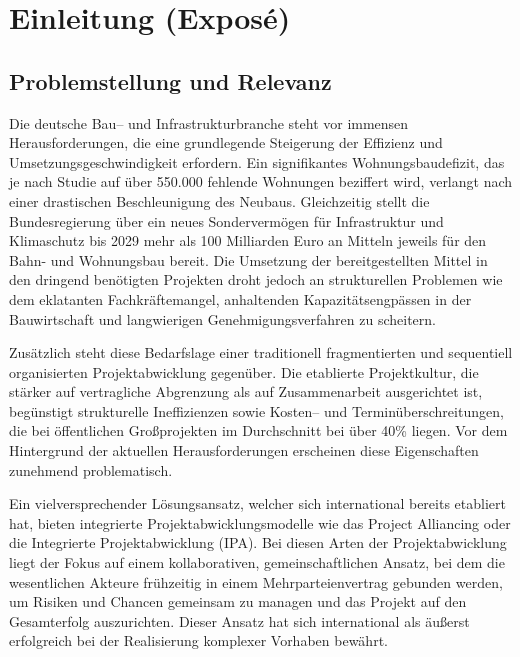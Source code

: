 \chapter{Einleitung (Exposé)}
\label{ch:einleitung}

\section*{Problemstellung und Relevanz}
\label{sec:problemstellung}
Die deutsche Bau-- und Infrastrukturbranche steht vor immensen Herausforderungen, die  eine grundlegende Steigerung der Effizienz und Umsetzungsgeschwindigkeit erfordern.  Ein signifikantes Wohnungsbaudefizit, das je nach Studie auf über 550.000 fehlende  Wohnungen beziffert wird, verlangt nach einer drastischen Beschleunigung des Neubaus\autocite[]{pestel2025}. Gleichzeitig stellt die  Bundesregierung über ein neues Sondervermögen für Infrastruktur und Klimaschutz bis  2029 mehr als 100 Milliarden Euro an Mitteln jeweils für den Bahn- und Wohnungsbau  bereit\autocite[]{brinkmeier2025}. Die Umsetzung der bereitgestellten Mittel in den dringend  benötigten Projekten droht jedoch an strukturellen Problemen wie dem eklatanten  Fachkräftemangel, anhaltenden Kapazitätsengpässen in der Bauwirtschaft und  langwierigen Genehmigungsverfahren zu scheitern\autocite[]{hdb2025}.

Zusätzlich steht diese Bedarfslage einer traditionell fragmentierten und sequentiell  organisierten Projektabwicklung gegenüber. Die etablierte Projektkultur, die stärker auf  vertragliche Abgrenzung als auf Zusammenarbeit ausgerichtet ist, begünstigt strukturelle  Ineffizienzen sowie Kosten-- und Terminüberschreitungen, die bei öffentlichen  Großprojekten im Durchschnitt bei über 40\% liegen\autocite[]{korn2019}. Vor dem  Hintergrund der aktuellen Herausforderungen erscheinen diese Eigenschaften  zunehmend problematisch.

Ein vielversprechender Lösungsansatz, welcher sich international bereits etabliert hat,  bieten integrierte Projektabwicklungsmodelle wie das Project Alliancing oder die  Integrierte Projektabwicklung (IPA). Bei diesen Arten der Projektabwicklung liegt der  Fokus auf einem kollaborativen, gemeinschaftlichen Ansatz, bei dem die wesentlichen  Akteure frühzeitig in einem Mehrparteienvertrag gebunden werden, um Risiken und  Chancen gemeinsam zu managen und das Projekt auf den Gesamterfolg auszurichten.  Dieser Ansatz hat sich international als äußerst erfolgreich bei der Realisierung  komplexer Vorhaben bewährt\autocite[]{cook2014}.

